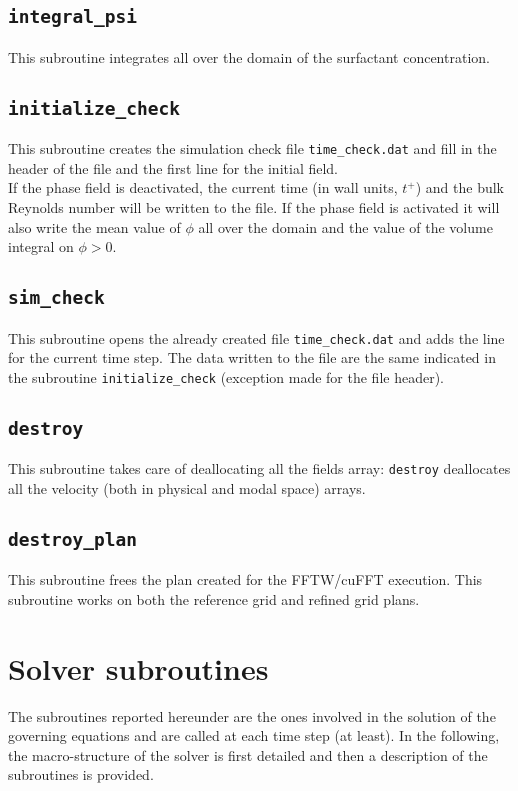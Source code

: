 \subsection{\texttt{integral\_psi}}
This subroutine integrates all over the domain of the surfactant concentration.

\subsection{\texttt{initialize\_check}}
This subroutine creates the simulation check file \texttt{time\_check.dat} and fill in the header of the file and the first line for the initial field.\\ 
If the phase field is deactivated, the current time (in wall units, $t^+$) and the bulk Reynolds number will be written to the file. If the phase field is activated it will also write the mean value of $\phi$ all over the domain and the value of the volume integral on $\phi>0$.
 
\subsection{\texttt{sim\_check}}
This subroutine opens the already created file \texttt{time\_check.dat} and adds the line for the current time step. The data written to the file are the same indicated in the subroutine \texttt{initialize\_check} (exception made for the file header).


\subsection{\texttt{destroy}}
This subroutine takes care of deallocating all the fields array: \texttt{destroy} deallocates all the velocity (both in physical and modal space) arrays.

\subsection{\texttt{destroy\_plan}}
This subroutine frees the plan created for the FFTW/cuFFT execution.
This subroutine works on both the reference grid and refined grid plans.

\section{Solver subroutines}
\label{sec: solver}
The subroutines reported hereunder are the ones involved in the solution of the governing equations and are called at each time step (at least).
In the following, the macro-structure of the solver is first detailed and then a description of the subroutines is provided.

